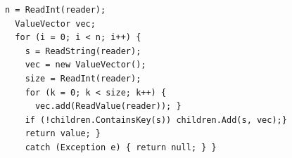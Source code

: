 \documentclass[12pt,a4paper]{article}
\begin{document}
\begin{appendices}
\begin{lstlisting}[caption={Sodep ReadValue method},label={lst:sodepReadValue}]
  n = ReadInt(reader);                                                                                                                                                                         
  ValueVector vec;                                                                                                                                                                             
  for (i = 0; i < n; i++) {                                                                                                                                                                                            
    s = ReadString(reader);                                                                                                                                                                  
    vec = new ValueVector();                                                                                                                                                                 
    size = ReadInt(reader);                                                                                                                                                                  
    for (k = 0; k < size; k++) {                                                                                                                                                                                        
      vec.add(ReadValue(reader)); }                                                                                                                                                                                        
    if (!children.ContainsKey(s)) children.Add(s, vec);}                                                                                                                                                                                            
    return value; }                                                                                                                                                                                                
	catch (Exception e) { return null; } }
\end{lstlisting}

\newpage

\end{appendices}
\end{document}
